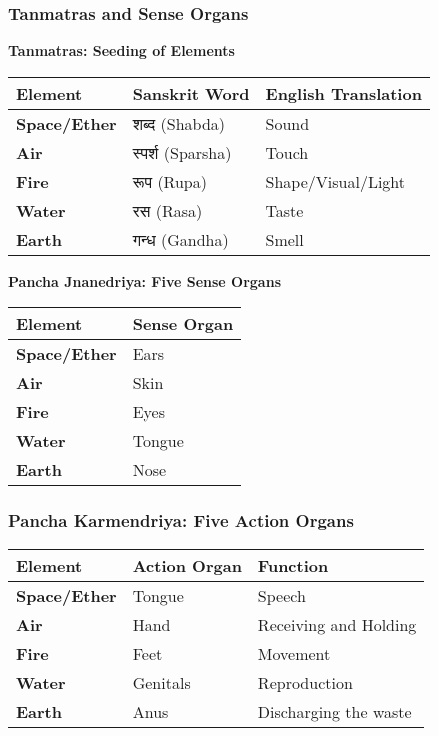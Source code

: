 \begin{frame}[fragile]\frametitle{Tanmatras and Sense Organs}
    \textbf{Tanmatras: Seeding of Elements}
	
	
    \begin{tabular}{|l|l|l|}
    \hline
    \textbf{Element} & \textbf{Sanskrit Word} & \textbf{English Translation} \\
    \hline
    \textbf{Space/Ether} & शब्द (Shabda) & Sound \\
    \hline
    \textbf{Air} & स्पर्श (Sparsha) & Touch \\
    \hline
    \textbf{Fire} & रूप (Rupa) & Shape/Visual/Light \\
    \hline
    \textbf{Water} & रस (Rasa) & Taste \\
    \hline
    \textbf{Earth} & गन्ध (Gandha) & Smell \\
    \hline
    \end{tabular}


    \textbf{Pancha Jnanedriya: Five Sense Organs}
	
    \begin{tabular}{|l|l|}
    \hline
    \textbf{Element} & \textbf{Sense Organ} \\
    \hline
    \textbf{Space/Ether} & Ears \\
    \hline
    \textbf{Air} & Skin \\
    \hline
    \textbf{Fire} & Eyes \\
    \hline
    \textbf{Water} & Tongue \\
    \hline
    \textbf{Earth} & Nose \\
    \hline
    \end{tabular}
\end{frame}

\begin{frame}[fragile]\frametitle{Pancha Karmendriya: Five Action Organs}
    \begin{tabular}{|l|l|l|}
    \hline
    \textbf{Element} & \textbf{Action Organ} & \textbf{Function} \\
    \hline
    \textbf{Space/Ether} & Tongue & Speech \\
    \hline
    \textbf{Air} & Hand & Receiving and Holding \\
    \hline
    \textbf{Fire} & Feet & Movement \\
    \hline
    \textbf{Water} & Genitals & Reproduction \\
    \hline
    \textbf{Earth} & Anus & Discharging the waste \\
    \hline
    \end{tabular}
\end{frame}

